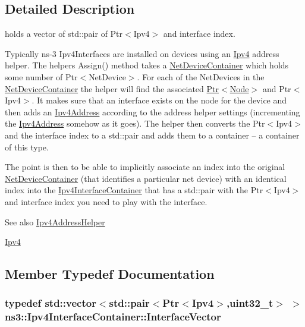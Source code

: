 \subsection{Detailed Description}
holds a vector of std\+::pair of Ptr$<$\+Ipv4$>$ and interface index. 

Typically ns-\/3 Ipv4\+Interfaces are installed on devices using an \hyperlink{classns3_1_1Ipv4}{Ipv4} address helper. The helper\textquotesingle{}s Assign() method takes a \hyperlink{classns3_1_1NetDeviceContainer}{Net\+Device\+Container} which holds some number of Ptr$<$\+Net\+Device$>$. For each of the Net\+Devices in the \hyperlink{classns3_1_1NetDeviceContainer}{Net\+Device\+Container} the helper will find the associated \hyperlink{classns3_1_1Ptr}{Ptr$<$\+Node$>$} and Ptr$<$\+Ipv4$>$. It makes sure that an interface exists on the node for the device and then adds an \hyperlink{classns3_1_1Ipv4Address}{Ipv4\+Address} according to the address helper settings (incrementing the \hyperlink{classns3_1_1Ipv4Address}{Ipv4\+Address} somehow as it goes). The helper then converts the Ptr$<$\+Ipv4$>$ and the interface index to a std\+::pair and adds them to a container -- a container of this type.

The point is then to be able to implicitly associate an index into the original \hyperlink{classns3_1_1NetDeviceContainer}{Net\+Device\+Container} (that identifies a particular net device) with an identical index into the \hyperlink{classns3_1_1Ipv4InterfaceContainer}{Ipv4\+Interface\+Container} that has a std\+::pair with the Ptr$<$\+Ipv4$>$ and interface index you need to play with the interface.

\begin{DoxySeeAlso}{See also}
\hyperlink{classns3_1_1Ipv4AddressHelper}{Ipv4\+Address\+Helper} 

\hyperlink{classns3_1_1Ipv4}{Ipv4} 
\end{DoxySeeAlso}


\subsection{Member Typedef Documentation}
\subsubsection[{\texorpdfstring{Interface\+Vector}{InterfaceVector}}]{\setlength{\rightskip}{0pt plus 5cm}typedef std\+::vector$<$std\+::pair$<${\bf Ptr}$<${\bf Ipv4}$>$,uint32\+\_\+t$>$ $>$ {\bf ns3\+::\+Ipv4\+Interface\+Container\+::\+Interface\+Vector}\hspace{0.3cm}{\ttfamily [private]}}\hypertarget{classns3_1_1Ipv4InterfaceContainer_aa8ccc14e1294bb6d73b9feb7546dc0bc}{}\label{classns3_1_1Ipv4InterfaceContainer_aa8ccc14e1294bb6d73b9feb7546dc0bc}


